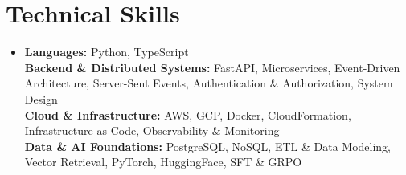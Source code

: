 \section{Technical Skills}
\begin{itemize}[leftmargin=0.18in, label={}, itemsep=1pt, parsep=0pt, topsep=2pt]
    \small\item
        \textbf{Languages:} Python, TypeScript \\
        \textbf{Backend \& Distributed Systems:} FastAPI, Microservices, Event-Driven Architecture, Server-Sent Events, Authentication \& Authorization, System Design \\
        \textbf{Cloud \& Infrastructure:} AWS, GCP, Docker, CloudFormation, Infrastructure as Code, Observability \& Monitoring \\
        \textbf{Data \& AI Foundations:} PostgreSQL, NoSQL, ETL \& Data Modeling, Vector Retrieval, PyTorch, HuggingFace, SFT \& GRPO
\end{itemize}
